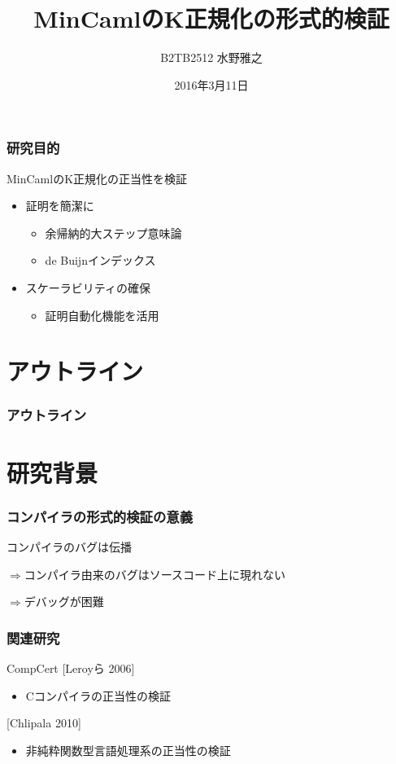 \documentclass[dvipdfmx,cjk,xcolor=dvipsnames,envcountsect,notheorems,12pt]{beamer}
\title{MinCamlのK正規化の形式的検証}
\author{B2TB2512 水野雅之}
\institute[東北大学　住井・松田研]{工学部　情報知能システム総合学科\\住井・松田研究室}%
\date{2016年3月11日}
\theoremstyle{definition}
\begin{document}
\frame[plain]{\titlepage}%

\begin{frame}
	\frametitle{研究目的}
	\LARGE MinCamlのK正規化の正当性を検証
	\begin{itemize}
		\item 証明を簡潔に
			\begin{itemize}
				\item 余帰納的大ステップ意味論
				\item de Buijnインデックス
			\end{itemize}
		\item スケーラビリティの確保
			\begin{itemize}
				\item 証明自動化機能を活用
			\end{itemize}
	\end{itemize}
\end{frame}

\section*{アウトライン}

\begin{frame}
  \frametitle{アウトライン}
  \tableofcontents[sectionstyle=show,subsectionstyle=hide]
\end{frame}

\section{研究背景}

\begin{frame}
	\frametitle{コンパイラの形式的検証の意義}
	\Large コンパイラのバグは伝播

	\vfill

	$\Rightarrow$コンパイラ由来のバグはソースコード上に現れない

	\vfill

	$\Rightarrow$デバッグが困難
\end{frame}

\begin{frame}
	\frametitle{関連研究}
	\LARGE CompCert [Leroyら 2006]
	\begin{itemize}
		\item Cコンパイラの正当性の検証
	\end{itemize}

	[Chlipala 2010]
	\begin{itemize}
		\item 非純粋関数型言語処理系の正当性の検証
	\end{itemize}
\end{frame}
\end{document}

